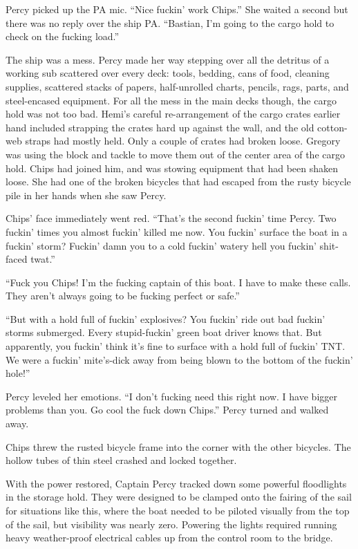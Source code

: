 \documentclass[]{scrbook}
\begin{document}
Percy picked up the PA mic. ``Nice fuckin' work Chips.'' She waited a
second but there was no reply over the ship PA. ``Bastian, I'm going to
the cargo hold to check on the fucking load.''

The ship was a mess. Percy made her way stepping over all the detritus
of a working sub scattered over every deck: tools, bedding, cans of
food, cleaning supplies, scattered stacks of papers, half-unrolled
charts, pencils, rags, parts, and steel-encased equipment. For all the
mess in the main decks though, the cargo hold was not too bad. Hemi's
careful re-arrangement of the cargo crates earlier hand included
strapping the crates hard up against the wall, and the old cotton-web
straps had mostly held. Only a couple of crates had broken loose.
Gregory was using the block and tackle to move them out of the center
area of the cargo hold. Chips had joined him, and was stowing equipment
that had been shaken loose. She had one of the broken bicycles that had
escaped from the rusty bicycle pile in her hands when she saw Percy.

Chips' face immediately went red. ``That's the second fuckin' time
Percy. Two fuckin' times you almost fuckin' killed me now. You fuckin'
surface the boat in a fuckin' storm? Fuckin' damn you to a cold fuckin'
watery hell you fuckin' shit-faced twat.''

``Fuck you Chips! I'm the fucking captain of this boat. I have to make
these calls. They aren't always going to be fucking perfect or safe.''

``But with a hold full of fuckin' explosives? You fuckin' ride out bad
fuckin' storms submerged. Every stupid-fuckin' green boat driver knows
that. But apparently, you fuckin' think it's fine to surface with a hold
full of fuckin' TNT. We were a fuckin' mite's-dick away from being blown
to the bottom of the fuckin' hole!''

Percy leveled her emotions. ``I don't fucking need this right now. I
have bigger problems than you. Go cool the fuck down Chips.'' Percy
turned and walked away.

Chips threw the rusted bicycle frame into the corner with the other
bicycles. The hollow tubes of thin steel crashed and locked together.

With the power restored, Captain Percy tracked down some powerful
floodlights in the storage hold. They were designed to be clamped onto
the fairing of the sail for situations like this, where the boat needed
to be piloted visually from the top of the sail, but visibility was
nearly zero. Powering the lights required running heavy weather-proof
electrical cables up from the control room to the bridge.
\end{document}
